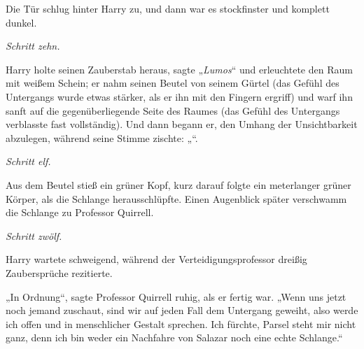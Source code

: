 Die Tür schlug hinter Harry zu, und dann war es stockfinster und komplett dunkel.

\emph{Schritt zehn.}

Harry holte seinen Zauberstab heraus, sagte „\emph{Lumos}“ und erleuchtete den Raum mit weißem Schein; er nahm seinen Beutel von seinem Gürtel (das Gefühl des Untergangs wurde etwas stärker, als er ihn mit den Fingern ergriff) und warf ihn sanft auf die gegenüberliegende Seite des Raumes (das Gefühl des Untergangs verblasste fast vollständig). Und dann begann er, den Umhang der Unsichtbarkeit abzulegen, während seine Stimme zischte: „“.

\emph{Schritt elf.}

Aus dem Beutel stieß ein grüner Kopf, kurz darauf folgte ein meterlanger grüner Körper, als die Schlange herausschlüpfte. Einen Augenblick später verschwamm die Schlange zu Professor Quirrell.

\emph{Schritt zwölf.}

Harry wartete schweigend, während der Verteidigungsprofessor dreißig Zaubersprüche rezitierte.

„In Ordnung“, sagte Professor Quirrell ruhig, als er fertig war. „Wenn uns jetzt noch jemand zuschaut, sind wir auf jeden Fall dem Untergang geweiht, also werde ich offen und in menschlicher Gestalt sprechen. Ich fürchte, Parsel steht mir nicht ganz, denn ich bin weder ein Nachfahre von Salazar noch eine echte Schlange.“

